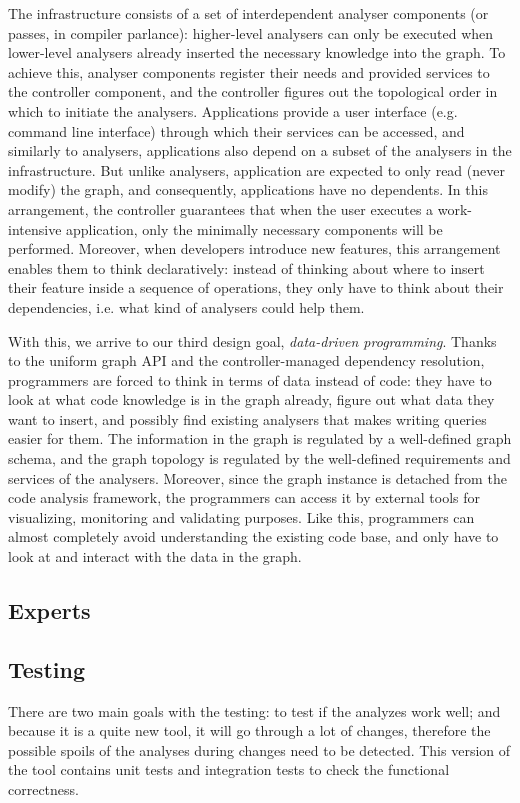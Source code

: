 \documentclass[sigconf]{acmart}
\begin{document}
The infrastructure consists of a set of interdependent analyser components (or passes, in compiler parlance): higher-level analysers can only be executed when lower-level analysers already inserted the necessary knowledge into the graph. To achieve this, analyser components register their needs and provided services to the controller component, and the controller figures out the topological order in which to initiate the analysers. 
Applications provide a user interface (e.g. command line interface) through which their services can be accessed, and similarly to analysers, applications also depend on a subset of the analysers in the infrastructure. But unlike analysers, application are expected to only read (never modify) the graph, and consequently, applications have no dependents. 
In this arrangement, the controller guarantees that when the user executes a work-intensive application, only the minimally necessary components will be performed.
Moreover, when developers introduce new features, this arrangement enables them to think declaratively: instead of thinking about where to insert their feature inside a sequence of operations, they only have to think about their dependencies, i.e. what kind of analysers could help them.

With this, we arrive to our third design goal, \textit{data-driven programming}. Thanks to the uniform graph API and the controller-managed dependency resolution, programmers are forced to think in terms of data instead of code: they have to look at what code knowledge is in the graph already, figure out what data they want to insert, and possibly find existing analysers that makes writing queries  easier for them. 
The information in the graph is regulated by a well-defined graph schema, and the graph topology is regulated by the well-defined requirements and services of the analysers. Moreover, since the graph instance is detached from the code analysis framework, the programmers can access it by external tools for visualizing, monitoring and validating purposes.
Like this, programmers can almost completely avoid understanding the existing code base, and only have to look at and interact with the data in the graph.  
	
	\subsection{Experts} %

	\subsection{Testing} %
	There are two main goals with the testing: to test if the analyzes work well; and because it is a quite new tool, it will go through a lot of changes, therefore the possible spoils of the analyses during changes need to be detected. This version of the tool contains unit tests and integration tests to check the functional correctness. 
	
\end{document}
